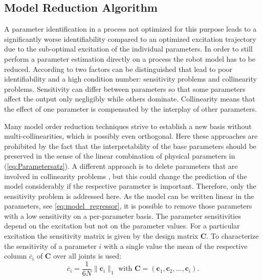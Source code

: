 
\subsection{Model Reduction Algorithm}
A parameter identification in a process not optimized for this purpose leads to a significantly worse identifiability compared to an optimized excitation trajectory due to the sub-optimal excitation of the individual parameters.
In order to still perform a parameter estimation directly on a process the robot model has to be reduced.
According to \cite{Brun2001} two factors can be distinguished that lead to poor identifiability and a high condition number: sensitivity problems and collinearity problems. 
Sensitivity can differ between parameters so that some parameters affect the output only negligibly while others dominate. Collinearity means that the effect of one parameter is compensated by the interplay of other parameters.

Many model order reduction techniques strive to establish a new basis without multi-collinearities, which is possibly even orthogonal. 
Here these approaches are prohibited by the fact that the interpretability of the base parameters should be preserved in the sense of the linear combination of physical parameters in (\ref{eq:Parametersatz}). 
A different approach is to delete parameters that are involved in collinearity problems \cite{Akinniyi2017}, but this could change the prediction of the model considerably if the respective parameter is important. Therefore, only the sensitivity problem is addressed here.
As the model can be written linear in the parameters, see \eqref{eq:model_regressor}, it is possible to remove those parameters with a low sensitivity on a per-parameter basis.
The parameter sensitivities depend on the excitation but not on the parameter values. For a particular excitation the sensitivity matrix is given by the design matrix $\boldsymbol{C}$. To characterize the sensitivity of a parameter $i$ with a single value the mean of the respective column $\overline{c}_i$ of $\boldsymbol{C}$ over all joints is used:
\begin{equation}\label{eq:mean_Sensitivity}
	\overline{c}_i = \frac{1}{6N} \| \boldsymbol{c}_i \|_1 \text{ with } \boldsymbol{C} = (\boldsymbol{c}_1, \boldsymbol{c}_2, \hdots, \boldsymbol{c}_i).
\end{equation}

